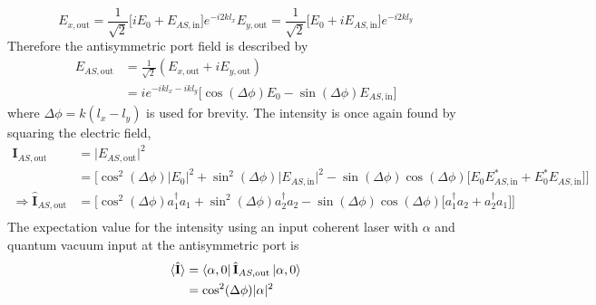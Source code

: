 		\begin{subequations}\label{exeyout}
		\begin{equation}
		E_{x,\text{out}} = \frac{1}{\sqrt{2}} \bigg[ iE_0 +   E_{AS,\text{in}} \bigg] e^{-i2k l_x}
		\end{equation}
		\begin{equation}
		E_{y,\text{out}} = \frac{1}{\sqrt{2}} \bigg[  E_0 + i E_{AS,\text{in}} \bigg] e^{-i2k l_y}
		\end{equation}
		\end{subequations}
		Therefore the antisymmetric port field is described by
		\begin{equation}
		\begin{aligned}
		E_{AS,\text{out}} 	&= \frac{1}{\sqrt{2}} (E_{x,\text{out}} + iE_{y,\text{out}})\\
					&= i e^{-ikl_x-ikl_y} \big[\cos(\Delta \phi) E_0 - \sin(\Delta \phi) E_{AS,\text{in}}\big]
		\end{aligned}
		\end{equation}
		where $\Delta \phi = k(l_x-l_y)$ is used for brevity.  The intensity is once again found by squaring the electric field,
		\begin{equation}
		\begin{aligned}
		\mathbf{I}_{AS,\text{out}} 		&= \vert E_{AS,\text{out}}\vert^2 \\
									&= \bigg[ \cos^2(\Delta \phi)\vert E_0\vert^2 + \sin^2(\Delta\phi)\vert E_{AS,\text{in}}\vert^2 - \sin(\Delta\phi)\cos(\Delta\phi) \big[E_0 E^*_{AS,\text{in}} + E_0^* E_{AS,\text{in}}\big] \bigg]\\
		\Rightarrow	
		\hat{\mathbf{I}}_{AS,\text{out}} 	&= \bigg[ \cos^2(\Delta \phi)a_1^{\dagger}a_1 + \sin^2(\Delta\phi)a_2^{\dagger}a_2 - \sin(\Delta\phi)\cos(\Delta \phi) \big[a_1^{\dagger}a_2 + a_2^{\dagger}a_1 \big] \bigg]\\	
		\end{aligned}
		\end{equation}
		The expectation value for the intensity using an input coherent laser with $\alpha$ and quantum vacuum input at the antisymmetric port is
		\begin{equation}
		\begin{aligned}
		\langle \hat{\mathbf{I}} \rangle 	&= \bra{\alpha,0} \hat{\mathbf{I}}_{AS,\text{out}} \ket{\alpha,0}\\
							&= \cos^2(\Delta \phi) \vert \alpha \vert^2
		\end{aligned}
		\end{equation}
